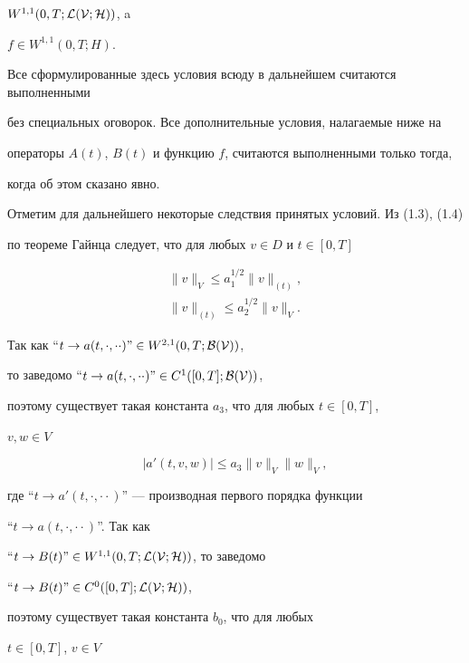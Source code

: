 $W^{1,1}(0,T;\cal L(V;H))$, a


$f\in W^{1,1}(0,T;H)$.





Все сформулированные здесь условия всюду в дальнейшем считаются выполненными


без специальных оговорок. Все дополнительные условия, налагаемые ниже на


операторы $A(t)$, $B(t)$ и функцию $f$, считаются выполненными только тогда,


когда об этом сказано явно.





Отметим для дальнейшего некоторые следствия принятых условий. Из (1.3), (1.4)


по теореме Гайнца следует, что для любых $v\in D$ и $t\in[0,T]$


\begin{gather}




\|v\|_V\le a_1^{1/2}\|v\|_{(t)},\\


\|v\|_{(t)}\le a_2^{1/2}\|v\|_V.


\end{gather}


Так как ``$t\to a(t,\cdot,\cdot\cdot)\text{''}\in W^{2,1}(0,T;\cal B(V))$,


то заведомо ``$t\to a(t,\cdot,\cdot\cdot)\text{''}\in C^1([0,T];\cal B(V))$,


поэтому существует такая константа $a_3$, что для любых $t\in[0,T]$,


$v,w\in V$


\begin{equation}


|a'(t,v,w)|\le a_3\|v\|_V\|w\|_V,


\end{equation}


где ``$t\to a'(t,\cdot,\cdot\cdot)$'' --- производная первого порядка функции


``$t\to a(t,\cdot,\cdot\cdot)$''. Так как


``$t\to B(t)\text{''}\in W^{1,1}(0,T;\cal L(V;H))$, то заведомо


``$t\to B(t)\text{''}\in C^0([0,T];\cal L(V;H))$,


поэтому существует такая константа $b_0$, что для любых


$t\in[0,T]$, $v\in V$


